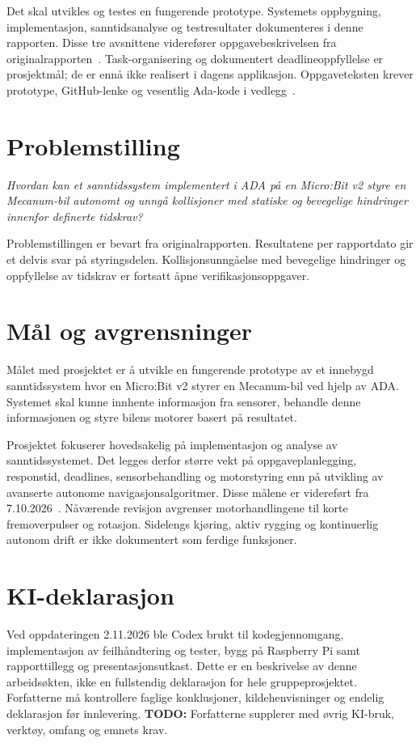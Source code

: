 \documentclass[a4paper,11pt,oneside]{report}
\newcommand{\todo}[1]{\textcolor{todocolor}{\textbf{TODO:} #1}}
\begin{document}
Det skal utvikles og testes en fungerende prototype. Systemets oppbygning,
implementasjon, sanntidsanalyse og testresultater dokumenteres i denne
rapporten. Disse tre avsnittene viderefører oppgavebeskrivelsen fra
originalrapporten~\cite{original}. Task-organisering og dokumentert
deadlineoppfyllelse er prosjektmål; de er ennå ikke realisert i dagens
applikasjon. Oppgaveteksten krever prototype, GitHub-lenke og vesentlig
Ada-kode i vedlegg~\cite{oppgave}.

\section{Problemstilling}
\textit{Hvordan kan et sanntidssystem implementert i ADA på en Micro:Bit v2
styre en Mecanum-bil autonomt og unngå kollisjoner med statiske og bevegelige
hindringer innenfor definerte tidskrav?}

Problemstillingen er bevart fra originalrapporten. Resultatene per rapportdato
gir et delvis svar på styringsdelen. Kollisjonsunngåelse med bevegelige
hindringer og oppfyllelse av tidskrav er fortsatt åpne verifikasjonsoppgaver.

\section{Mål og avgrensninger}
Målet med prosjektet er å utvikle en fungerende prototype av et innebygd
sanntidssystem hvor en Micro:Bit v2 styrer en Mecanum-bil ved hjelp av ADA.
Systemet skal kunne innhente informasjon fra sensorer, behandle denne
informasjonen og styre bilens motorer basert på resultatet.

Prosjektet fokuserer hovedsakelig på implementasjon og analyse av
sanntidssystemet. Det legges derfor større vekt på oppgaveplanlegging,
responstid, deadlines, sensorbehandling og motorstyring enn på utvikling av
avanserte autonome navigasjonsalgoritmer. Disse målene er videreført fra
7.10.2026~\cite{original}. Nåværende revisjon avgrenser motorhandlingene til
korte fremoverpulser og rotasjon. Sidelengs kjøring, aktiv rygging og
kontinuerlig autonom drift er ikke dokumentert som ferdige funksjoner.

\section{KI-deklarasjon}
Ved oppdateringen 2.11.2026 ble Codex brukt til kodegjennomgang,
implementasjon av feilhåndtering og tester, bygg på Raspberry Pi samt
rapporttillegg og presentasjonsutkast. Dette er en beskrivelse av denne
arbeidsøkten, ikke en fullstendig deklarasjon for hele gruppeprosjektet.
 Forfatterne må kontrollere faglige konklusjoner,
kildehenvisninger og endelig deklarasjon før innlevering.
\todo{Forfatterne supplerer med øvrig KI-bruk, verktøy, omfang og emnets krav.}
\end{document}
